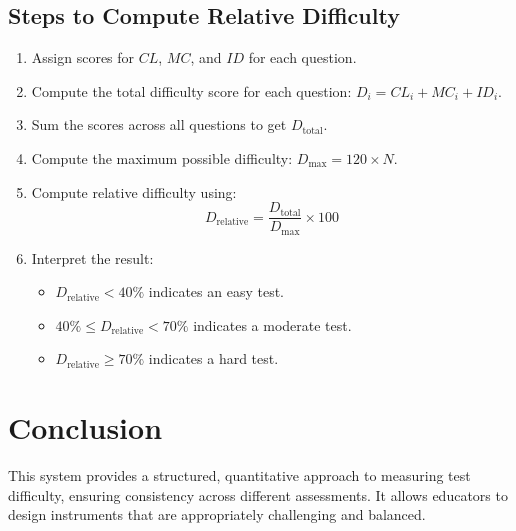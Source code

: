 \documentclass{article}
\begin{document}
\subsection{Steps to Compute Relative Difficulty}
\begin{enumerate}
    \item Assign scores for \( CL \), \( MC \), and \( ID \) for each question.
    \item Compute the total difficulty score for each question: \( D_i = CL_i + MC_i + ID_i \).
    \item Sum the scores across all questions to get \( D_{\text{total}} \).
    \item Compute the maximum possible difficulty: \( D_{\text{max}} = 120 \times N \).
    \item Compute relative difficulty using:
    \[
    D_{\text{relative}} = \frac{D_{\text{total}}}{D_{\text{max}}} \times 100
    \]
    \item Interpret the result:
    \begin{itemize}
        \item \( D_{\text{relative}} < 40\% \) indicates an easy test.
        \item \( 40\% \leq D_{\text{relative}} < 70\% \) indicates a moderate test.
        \item \( D_{\text{relative}} \geq 70\% \) indicates a hard test.
    \end{itemize}
\end{enumerate}

\section{Conclusion}
This system provides a structured, quantitative approach to measuring test difficulty, ensuring consistency across different assessments. It allows educators to design instruments that are appropriately challenging and balanced.
\end{document}
